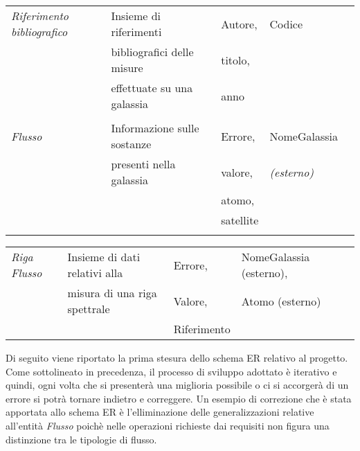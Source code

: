 \documentclass[12pt,a4paper,onecolumn,x11names]{article}
\begin{document}
\begin{table}[h!]
\begin{tabular}{lllll}
				\textit{Riferimento bibliografico}	& Insieme di riferimenti  & Autore,		&	Codice				\\
					& bibliografici delle misure  & titolo,		&					\\
				&effettuate su una galassia & anno		&					\\
				&						&				&					\\
				\textit{Flusso}			& Informazione sulle sostanze & Errore, 		& NomeGalassia \\
				& presenti nella galassia	&	valore,		& \textit{(esterno)}\\
				&							& atomo,		&					\\
				&							& satellite	&						\\
				&							&			&						\\
			\end{tabular}
		\end{table}
			
		\begin{table}
		\centering
			\begin{tabular}{lllll}
			\textit{Riga Flusso}	& Insieme di dati relativi alla  & Errore, & NomeGalassia (esterno),\\
			& misura di una riga spettrale & Valore,		&		Atomo (esterno)	\\
			&  & Riferimento		&				\\ 
			\end{tabular}
		\end{table}
	
		\begin{flushleft}
			Di seguito viene riportato la prima stesura dello schema ER relativo al progetto. Come sottolineato in precedenza, il processo di sviluppo adottato è iterativo e quindi, ogni volta che si presenterà una miglioria possibile o ci si accorgerà di un errore si potrà tornare indietro e correggere.\newline
			Un esempio di correzione che è stata apportata allo schema ER è l'elliminazione delle generalizzazioni relative all'entità \textit{Flusso} poichè nelle operazioni richieste dai requisiti non figura una distinzione tra le tipologie di flusso.
		\end{flushleft}
\end{document}
